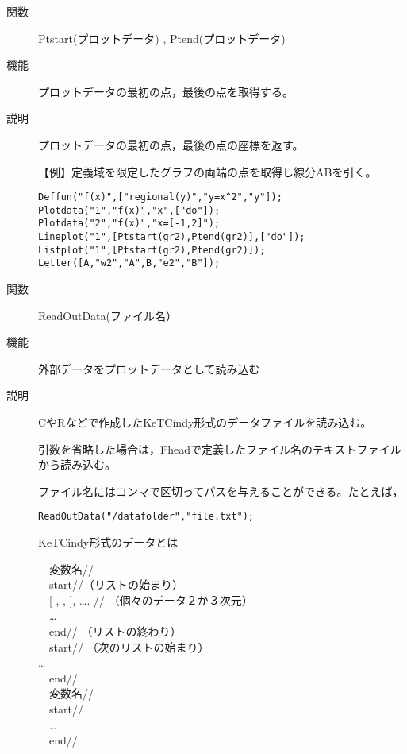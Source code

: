 \documentclass[papersize,a4paper,10pt,uplatex]{jsarticle}
\begin{document}
\begin{description}

\vspace{\baselineskip}
\hypertarget{ptstart}{}
\item[関数]Ptstart(プロットデータ) , Ptend(プロットデータ)
\item[機能]プロットデータの最初の点，最後の点を取得する。
\item[説明]プロットデータの最初の点，最後の点の座標を返す。

\vspace{\baselineskip}
【例】定義域を限定したグラフの両端の点を取得し線分ABを引く。
\begin{verbatim}
Deffun("f(x)",["regional(y)","y=x^2","y"]); 
Plotdata("1","f(x)","x",["do"]);
Plotdata("2","f(x)","x=[-1,2]");
Lineplot("1",[Ptstart(gr2),Ptend(gr2)],["do"]);
Listplot("1",[Ptstart(gr2),Ptend(gr2)]);
Letter([A,"w2","A",B,"e2","B"]);
\end{verbatim}
\vspace{\baselineskip}
\begin{center}  \end{center}

\vspace{\baselineskip}
\hypertarget{readoutdata}{}
\item[関数]ReadOutData(ファイル名）
\item[機能]外部データをプロットデータとして読み込む
\item[説明]CやRなどで作成したKeTCindy形式のデータファイルを読み込む。

引数を省略した場合は，Fheadで定義したファイル名のテキストファイルから読み込む。

ファイル名にはコンマで区切ってパスを与えることができる。たとえば，

\verb|ReadOutData("/datafolder","file.txt"); |

KeTCindy形式のデータとは

　変数名// \\
　start//（リストの始まり） \\
　[ , , ], …. // （個々のデータ２か３次元） \\
　… \\
　end// （リストの終わり） \\
　start// （次のリストの始まり） \\
… \\
　end// \\
　変数名// \\
　start// \\
　… \\
　end// \\


\end{description}
\end{document}
